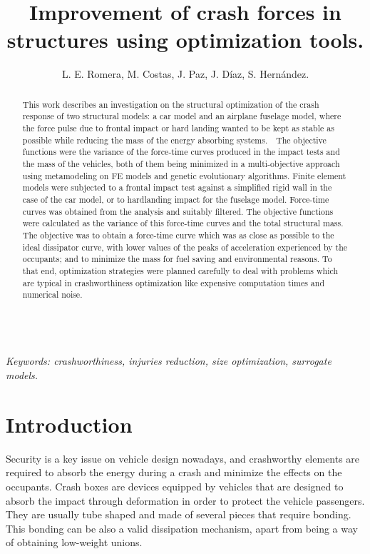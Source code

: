 \documentclass[cmfonts]{witpress}
\begin{document}
\title{Improvement of crash forces in structures using optimization tools.}

\author{L. E. Romera, M. Costas, J. Paz, J. D\'iaz, S. Hern\'andez.}

\address{Structural Mechanics Group, Universidade da Coru\~na, Spain.}

\maketitle

\begin{abstract}
This work describes an investigation on the structural optimization of the crash response of two structural models: a car model and an airplane fuselage model, where the force pulse due to frontal impact or hard landing wanted to be kept as stable as possible while reducing the mass of the energy absorbing systems.  The objective functions were the variance of the force-time curves produced in the impact tests and the mass of the vehicles, both of them being minimized in a multi-objective approach using metamodeling on FE models and genetic evolutionary algorithms. Finite element models were subjected to a frontal impact test against a simplified rigid wall in the case of the car model, or to hardlanding impact for the fuselage model. Force-time curves was obtained from the analysis and suitably filtered. The objective functions were calculated as the variance of this force-time curves and the total structural mass. The objective was to obtain a force-time curve which was as close as possible to the ideal dissipator curve, with lower values of the peaks of acceleration experienced by the occupants; and to minimize the mass for fuel saving and environmental reasons. To that end, optimization strategies were planned carefully to deal with problems which are typical in crashworthiness optimization like expensive computation times and numerical noise.
\end{abstract}\\
\emph{Keywords: crashworthiness, injuries reduction, size optimization, surrogate models.}

\section{Introduction}
Security is a key issue on vehicle design nowadays, and crashworthy elements are required to absorb the energy during a crash and minimize the effects on the occupants. Crash boxes are devices equipped by vehicles that are designed to absorb the impact through deformation in order to protect the vehicle passengers. They are usually tube shaped and made of several pieces that require bonding. This bonding can be also a valid dissipation mechanism, apart from being a way of obtaining low-weight unions.
\end{document}
